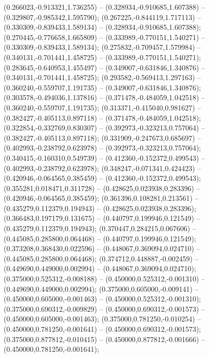  (0.266023,-0.913321,1.736255) -- (0.328934,-0.910685,1.607388) -- (0.329807,-0.985342,1.595790);
 (0.267225,-0.844119,1.717113) -- (0.330309,-0.839433,1.589134) -- (0.328934,-0.910685,1.607388);
 (0.270445,-0.776658,1.665809) -- (0.333989,-0.770151,1.540271) -- (0.330309,-0.839433,1.589134);
 (0.275832,-0.709457,1.579984) -- (0.340131,-0.701441,1.458725) -- (0.333989,-0.770151,1.540271);
 (0.283645,-0.640953,1.455497) -- (0.349007,-0.631846,1.340876) -- (0.340131,-0.701441,1.458725);
 (0.293582,-0.569413,1.297163) -- (0.360240,-0.559707,1.191735) -- (0.349007,-0.631846,1.340876);
 (0.303578,-0.494036,1.137816) -- (0.371478,-0.484059,1.042518) -- (0.360240,-0.559707,1.191735);
 (0.313371,-0.415040,0.981627) -- (0.382427,-0.405113,0.897118) -- (0.371478,-0.484059,1.042518);
 (0.322854,-0.332769,0.830307) -- (0.392973,-0.323213,0.757064) -- (0.382427,-0.405113,0.897118);
 (0.331909,-0.247673,0.685697) -- (0.402993,-0.238792,0.623978) -- (0.392973,-0.323213,0.757064);
 (0.340415,-0.160310,0.549739) -- (0.412360,-0.152372,0.499543) -- (0.402993,-0.238792,0.623978);
 (0.348247,-0.071341,0.424423) -- (0.420946,-0.064565,0.385459) -- (0.412360,-0.152372,0.499543);
 (0.355281,0.018471,0.311728) -- (0.428625,0.023938,0.283396) -- (0.420946,-0.064565,0.385459);
 (0.361396,0.108281,0.213561) -- (0.435279,0.112379,0.194943) -- (0.428625,0.023938,0.283396);
 (0.366483,0.197179,0.131675) -- (0.440797,0.199946,0.121549) -- (0.435279,0.112379,0.194943);
 (0.370447,0.284215,0.067606) -- (0.445085,0.285800,0.064468) -- (0.440797,0.199946,0.121549);
 (0.373208,0.368430,0.022596) -- (0.448067,0.369094,0.024710) -- (0.445085,0.285800,0.064468);
 (0.374712,0.448887,-0.002459) -- (0.449690,0.449000,0.002994) -- (0.448067,0.369094,0.024710);
 (0.375000,0.525312,-0.008188) -- (0.450000,0.525312,-0.001310) -- (0.449690,0.449000,0.002994);
 (0.375000,0.605000,-0.009141) -- (0.450000,0.605000,-0.001463) -- (0.450000,0.525312,-0.001310);
 (0.375000,0.690312,-0.009829) -- (0.450000,0.690312,-0.001573) -- (0.450000,0.605000,-0.001463);
 (0.375000,0.781250,-0.010254) -- (0.450000,0.781250,-0.001641) -- (0.450000,0.690312,-0.001573);
 (0.375000,0.877812,-0.010415) -- (0.450000,0.877812,-0.001666) -- (0.450000,0.781250,-0.001641);
